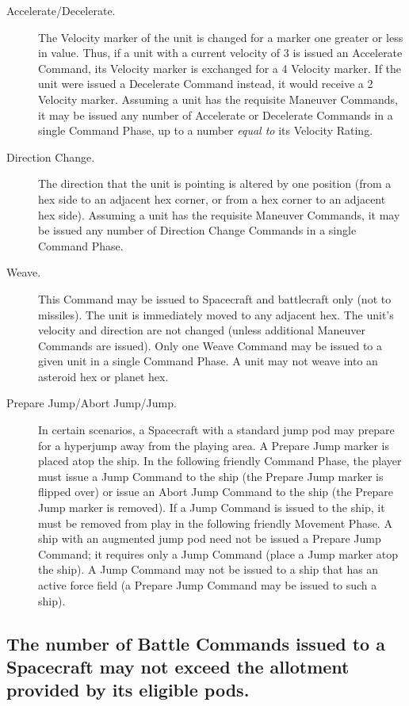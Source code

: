 \begin{description}
\item[Accelerate/Decelerate.] The Velocity marker of the unit is
changed for a marker one greater or less in value. Thus, if a unit
with a current velocity of 3 is issued an Accelerate Command, its
Velocity marker is exchanged for a 4 Velocity marker. If the unit were
issued a Decelerate Command instead, it would receive a 2 Velocity
marker. Assuming a unit has the requisite Maneuver Commands, it may be
issued any number of Accelerate or Decelerate Commands in a single
Command Phase, up to a number \emph{equal to} its Velocity Rating.

\item[Direction Change.] The direction that the unit is pointing is
altered by one position (from a hex side to an adjacent hex corner, or
from a hex corner to an adjacent hex side). Assuming a unit has the
requisite Maneuver Commands, it may be issued any number of Direction
Change Commands in a single Command Phase.

\item[Weave.] This Command may be issued to Spacecraft and
battlecraft only (not to missiles). The unit is immediately moved to
any adjacent hex. The unit's velocity and direction are not changed
(unless additional Maneuver Commands are issued). Only one Weave
Command may be issued to a given unit in a single Command Phase. A
unit may not weave into an asteroid hex or planet hex.

\item[Prepare Jump/Abort Jump/Jump.] In certain scenarios, a
Spacecraft with a standard jump pod may prepare for a hyperjump away
from the playing area. A Prepare Jump marker is placed atop the ship.
In the following friendly Command Phase, the player must issue a Jump
Command to the ship (the Prepare Jump marker is flipped over) or issue
an Abort Jump Command to the ship (the Prepare Jump marker is
removed). If a Jump Command is issued to the ship, it must be removed
from play in the following friendly Movement Phase. A ship with an
augmented jump pod need not be issued a Prepare Jump Command; it
requires only a Jump Command (place a Jump marker atop the ship). A
Jump Command may not be issued to a ship that has an active force
field (a Prepare Jump Command may be issued to such a ship).
\end{description}

\subsection[Number Of Battle Commands]{The number of Battle Commands
  issued to a Spacecraft may not exceed the allotment provided by its  
  eligible pods.}
\label{sec:number-battle-commands-1}



